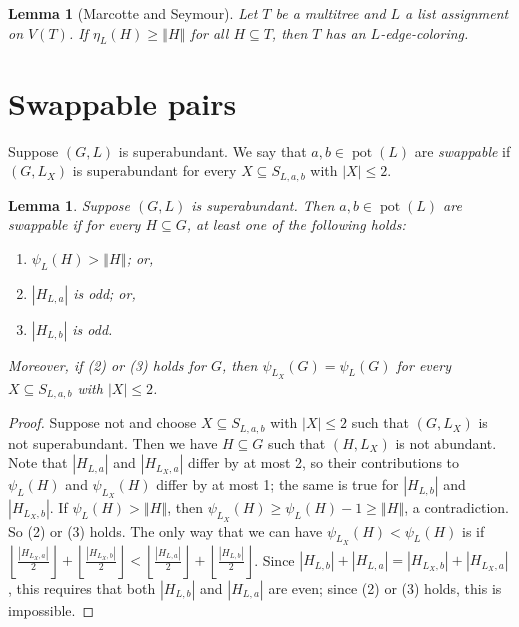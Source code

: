 \documentclass[12pt]{article}
\theoremstyle{plain}
\newtheorem{lem}[thm]{Lemma}
\theoremstyle{definition}
\theoremstyle{remark}
\newcommand{\card}[1]{\left|#1\right|}
\newcommand{\size}[1]{\left\Vert#1\right\Vert}
\newcommand{\floor}[1]{\left\lfloor#1\right\rfloor}
\newcommand{\pot}{\operatorname{pot}}
\begin{document}
\begin{lem}[Marcotte and Seymour]\label{MultiTreeHall}
	Let $T$ be a multitree and $L$ a list assignment on $V(T)$.  If $\eta_L(H) \ge
	\size{H}$ for all $H \subseteq T$, then $T$ has an $L$-edge-coloring.
\end{lem}

\section{Swappable pairs}
Suppose $(G,L)$ is superabundant.  We say that $a,b \in \pot(L)$ are \emph{swappable} if $(G,L_X)$ is superabundant for every $X \subseteq S_{L,a,b}$ with $\card{X} \le 2$.

\begin{lem}\label{SwappableCondition}
	Suppose $(G, L)$ is superabundant.  Then $a, b \in \pot(L)$ are swappable if for every $H \subseteq G$, at least one of the following holds:
	\begin{enumerate}
		\item $\psi_L(H) > \size{H}$; or,
		\item $\card{H_{L, a}}$ is odd; or,
		\item $\card{H_{L, b}}$ is odd.
	\end{enumerate}
	Moreover, if (2) or (3) holds for $G$, then $\psi_{L_X}(G) = \psi_L(G)$ for every $X \subseteq S_{L,a,b}$ with $\card{X} \le 2$.
\end{lem}

\begin{proof}
	Suppose not and choose $X \subseteq S_{L,a,b}$ with $\card{X} \le 2$ such that $(G,L_X)$ is not superabundant.  
	Then we have $H \subseteq G$ such that $(H,L_X)$ is not abundant.	Note that $\card{H_{L,a}}$ and
	$\card{H_{L_X,a}}$ differ by at most 2, so their contributions to
	$\psi_L(H)$ and $\psi_{L_X}(H)$ differ by at most 1; the same is true for
	$\card{H_{L,b}}$ and $\card{H_{L_X,b}}$.  
	If $\psi_L(H)>\size{H}$, then $\psi_{L_X}(H) \ge \psi_L(H)-1\ge \size{H}$, a contradiction.
	So (2) or (3) holds.	The only way that we can have
	$\psi_{L_X}(H)<\psi_L(H)$ is if $\floor{\frac{\card{H_{L_X, a}}}{2}} +
	\floor{\frac{\card{H_{L_X, b}}}{2}} < \floor{\frac{\card{H_{L, a}}}{2}}
	+ \floor{\frac{\card{H_{L, b}}}{2}}$.  
	Since $\card{H_{L, b}} + \card{H_{L, a}} = \card{H_{L_X, b}} +
	\card{H_{L_X, a}}$,   this requires that both $\card{H_{L, b}}$ and
	$\card{H_{L, a}}$ are even; since (2) or (3) holds, this is impossible.
\end{proof}
\end{document}
